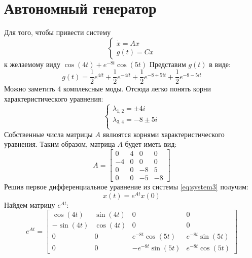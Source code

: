 \section{Автономный генератор}

Для того, чтобы привести систему
\begin{equation}
    \begin{cases}
        \dot{x} = Ax \\ 
        g(t) = Cx
    \end{cases}
    \label{eq:system3}
\end{equation}
к желаемому виду $\cos(4t) + e^{-8t}\cos(5t)$
Представим $g(t)$ в виде:
\begin{equation}
    g(t) = \frac{1}{2}e^{4it} + \frac{1}{2}e^{-4it} + \frac{1}{2}e^{-8 + 5it} + \frac{1}{2}e^{-8 - 5it}
\end{equation}
Можно заметить 4 комплексные моды. Отсюда легко понять корни характеристического уравнения:
\begin{equation}
    \begin{cases}
        \lambda_{1, 2} = \pm4i \\ 
        \lambda_{3, 4} = -8 \pm 5i \\ 
    \end{cases}
\end{equation}
Собственные числа матрицы $A$ явлюятся корнями характеристического уравнения. Таким образом, матрица $A$ будет иметь вид:
\begin{equation}
    A = \begin{bmatrix}
        0 & 4 & 0 & 0 \\
        -4 & 0 & 0 & 0 \\
        0 & 0 & -8 & 5 \\
        0 & 0 & -5 & -8
    \end{bmatrix}
\end{equation}
Решив первое дифференциальное уравнение из системы \ref{eq:system3} получим:
\begin{equation}
    x(t) = e^{At} x(0)
\end{equation}
Найдем матрицу $e^{At}$:
\begin{equation}
    e^{At} =  \begin{bmatrix}
        \cos\left(4t\right) & \sin\left(4t\right) & 0 & 0 \\
        -\sin\left(4t\right) & \cos\left(4t\right) & 0 & 0 \\
        0 & 0 & e^{-8t}\cos\left(5t\right) & e^{-8t}\sin\left(5t\right) \\
        0 & 0 & -e^{-8t}\sin\left(5t\right) & e^{-8t}\cos\left(5t\right)
    \end{bmatrix}
\end{equation}
